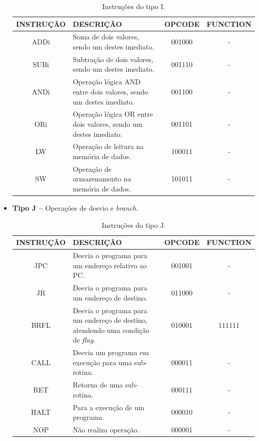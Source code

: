 \documentclass{report}
\begin{document}
\begin{itemize}
	\begin{table}[H]
	\centering
	\begin{tabular}{|c|m{6cm}|c|c|}
  	\hline 
  	\textbf{INSTRUÇÃO} & \textbf{DESCRIÇÃO} & \textbf{OPCODE} & \textbf{FUNCTION} \\ 
  	\hline 
  	ADDi & Soma de dois valores, sendo um destes imediato. & 001000 & - \\ \hline
  	SUBi & Subtração de dois valores, sendo um destes imediato. & 001110 & - \\ \hline
  	ANDi & Operação lógica AND entre dois valores, sendo um destes imediato. & 001100 & - \\ \hline
  	ORi  & Operação lógica OR entre dois valores, sendo um destes imediato. & 001101 & - \\ \hline
    LW   & Operação de leitura na memória de dados. & 100011 & - \\ \hline
    SW   & Operação de armazenamento na memória de dados. & 101011 & - \\ \hline
  	\end{tabular} 
  	\caption{Instruções do tipo I.}
  \end{table}
    
    \item \textbf{Tipo J --} Operações de desvio e \textit{branch}.
    
	\begin{table}[H]
	\centering
	\begin{tabular}{|c|m{6cm}|c|c|}
  	\hline 
  	\textbf{INSTRUÇÃO} & \textbf{DESCRIÇÃO} & \textbf{OPCODE} & \textbf{FUNCTION} \\ 
  	\hline 
  	JPC  & Desvia o programa para um endereço relativo ao PC. & 001001 & - \\ \hline
    JR   & Desvia o programa para um endereço de destino. & 011000 & - \\ \hline
  	BRFL & Desvia o programa para um endereço de destino, atendendo uma condição de \textit{flag}. & 010001 & 111111 \\ \hline
  	CALL & Desvia um programa em execução para uma sub-rotina. & 000011 & - \\ \hline
  	RET  & Retorna de uma sub-rotina. & 000111 & - \\ \hline
  	HALT & Para a execução de um programa. & 000010 & - \\ \hline
  	NOP  & Não realiza operação. & 000001 & - \\ \hline
  	\end{tabular} 
  	\caption{Instruções do tipo J.}
  \end{table}
    
    \end{itemize}
\end{document}
